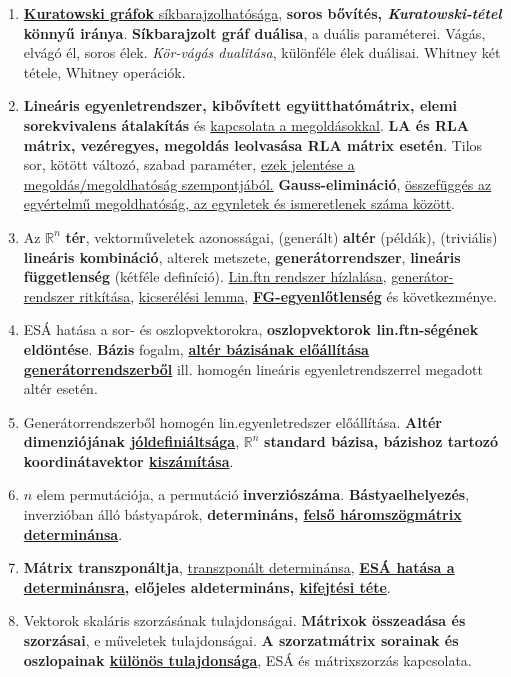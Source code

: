 \documentclass[10pt]{article}
\begin{document}
\begin{enumerate}
            \sloppy\item \underline{\textbf{Kuratowski gráfok} síkbarajzolhatósága}, \textbf{soros bővítés, \textit{Kuratowski-tétel} könnyű iránya}. \textbf{Síkbarajzolt gráf duálisa}, a duális paraméterei. Vágás, elvágó él, soros élek. \textit{Kör-vágás dualitása}, különféle élek duálisai. Whitney két tétele, Whitney operációk.
            \item \textbf{Lineáris egyenletrendszer, kibővített együtthatómátrix, elemi sorekvivalens átalakítás} és \underline{kapcsolata a megoldásokkal}. \textbf{LA és RLA mátrix, vezéregyes, megoldás leolvasása RLA mátrix esetén}. Tilos sor, kötött változó, szabad paraméter, \underline{ezek jelentése a megoldás/megoldhatóság szempontjából.} \textbf{Gauss-elimináció}, \underline{összefüggés az egyértelmű megoldhatóság, az egynletek és ismeretlenek száma között}.
            \item Az $\mathbb{R}^n$ \textbf{tér}, vektorműveletek azonosságai, (generált) \textbf{altér} (példák), (triviális) \textbf{lineáris kombináció}, alterek metszete, \textbf{generátorrendszer}, \textbf{lineáris függetlenség} (kétféle definíció). \underline{Lin.ftn rendszer hízlalása}, \underline{generátor-rendszer ritkítása}, \underline{kicserélési lemma}, \underline{\textbf{FG-egyenlőtlenség}} és következménye.
            \item ESÁ hatása a sor- és oszlopvektorokra, \textbf{oszlopvektorok lin.ftn-ségének eldöntése}. \textbf{Bázis} fogalm, \underline{\textbf{altér bázisának előállítása generátorrendszerből}} ill. homogén lineáris egyenletrendszerrel megadott altér esetén.
            \item Generátorrendszerből homogén lin.egyenletredszer előállítása. \textbf{Altér dimenziójának \underline{jóldefiniáltsága}}, $\mathbb{R}^n$ \textbf{standard bázisa, bázishoz tartozó koordinátavektor \underline{kiszámítása}}.
            \item $n$ elem permutációja, a permutáció \textbf{inverziószáma}. \textbf{Bástyaelhelyezés}, inverzióban álló bástyapárok, \textbf{determináns, \underline{felső háromszögmátrix determinánsa}}.
            \item \textbf{Mátrix transzponáltja}, \underline{transzponált determinánsa}, \textbf{\underline{ESÁ hatása a determinánsra}, előjeles aldetermináns, \underline{kifejtési téte}}.
            \item Vektorok skaláris szorzásának tulajdonságai. \textbf{Mátrixok összeadása és szorzásai}, e műveletek tulajdonságai. \textbf{A szorzatmátrix sorainak és oszlopainak \underline{különös tulajdonsága}}, ESÁ és mátrixszorzás kapcsolata.

\end{enumerate}
\end{document}
